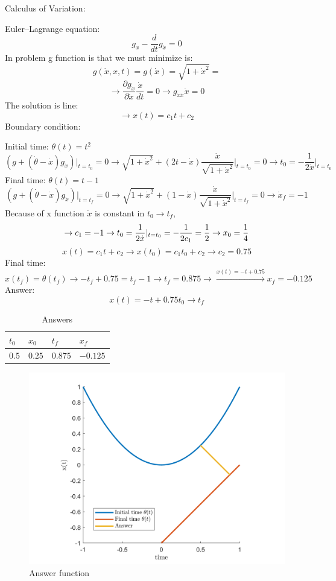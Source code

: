 Calculus of Variation:


Euler–Lagrange equation:
$$g_x - \dfrac{d}{dt}g_{\dot{x}} = 0$$
In problem g function is that we must minimize is:
$$g(\dot{x}, x, t) = g(\dot{x}) = \sqrt{1+\dot{x}^2} = $$
$$\to \dfrac{\partial g_{\dot{x}}}{\partial \dot{x}} \dfrac{\dot{x}}{dt} = 0 \to g_{\dot{x}\dot{x}}\ddot{x} = 0 $$
The solution is line:
$$\to x(t) = c_1t+ c_2$$
Boundary condition:



Initial time: 
$\theta(t) = t^2 $
$$(g + (\dot{\theta}-\dot{x})g_{\dot{x}}) \vert_{t = t_0}= 0 \to \sqrt{1+\dot{x}^2} + (2t -\dot{x} )\dfrac{\dot{x}}{\sqrt{1+\dot{x}^2}}\vert_{t = t_0} = 0 \to t_0 = -\dfrac{1}{2\dot{x}}\vert_{t = t_0}$$
Final time: 
$\theta(t) = t-1 $
$$(g + (\dot{\theta}-\dot{x})g_{\dot{x}})\vert_{t = t_f}  = 0 \to \sqrt{1+\dot{x}^2} + (1-\dot{x}) \dfrac{\dot{x}}{\sqrt{1+\dot{x}^2}}\vert_{t = t_f} = 0 \to \dot{x}_f = -1$$
Because of x function $\dot{x}$ is constant in $t_0 \to t_f$,
$$\to c_1 = -1\\
\to t_0 = \dfrac{1}{2\dot{x}}\vert_{t = t_0} =-\dfrac{1}{2c_1} = \dfrac12 \to x_0 = \frac14 $$ 
$$x(t) = c_1t+c_2 \to x(t_0) = c_1t_0 + c_2 \to c_2 = 0.75$$
Final time:
$$x(t_f) = \theta(t_f) \to -t_f + 0.75 = t_f-1 \to t_f = 0.875 \to \xrightarrow{x(t) = -t+0.75} x_f = -0.125$$
Answer:
$$x(t) = -t+0.75 t_0 \to t_f$$

\begin{table}[H]
	\caption {Answers} \label{ans} 
	\begin{center}
		\begin{tabular}{| l | l | l | l |}
			\hline
			$t_0$ & $x_0$ & $t_f$ & $x_f$ \TBstrut \\
			\hline
			$0.5$ & $0.25$ & $0.875$ & $-0.125$ \Tstrut\\
			\hline
		\end{tabular}
	\end{center}
\end{table}
\begin{figure}[H]
	\caption{Answer function}
	\centering
	\includegraphics[width=12cm]{Q3/figures/Q3figureFix.png}
\end{figure}
